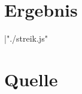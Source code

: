 \documentclass[11pt,twoside,openright,largecrownvopaper]
{memoir}
\begin{document}
\section{Ergebnis}
\noindent
|"./streik.js"
\newpage

\section{Quelle}
\inputminted{javascript}{streik.js}
\newpage
\inputminted{latex}{streik.tex}
\end{document}
